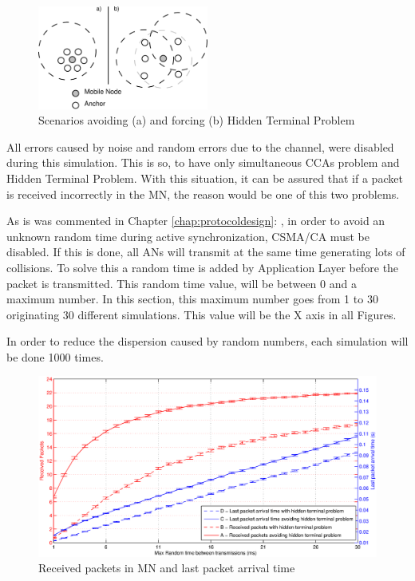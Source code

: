 \begin{figure}[ht]
 \begin{center}
  \includegraphics[width=0.5\textwidth]{hiddenvsnohidden.eps}
 \end{center}
 \caption{Scenarios avoiding (a) and forcing (b) Hidden Terminal Problem}
 \label{fig:hiddenvsnohidden}
\end{figure}

All errors caused by noise and random errors due to the channel, were disabled during this simulation. This is so, to have only simultaneous \acp{CCA} 
problem and Hidden Terminal Problem. With this situation, it can be assured that if a packet is received incorrectly in the \ac{MN}, the reason would 
be one of this two problems.

As is was commented in Chapter \ref{chap:protocoldesign}: , in order to avoid an unknown random time during active 
synchronization, \ac{CSMA/CA} must be disabled. If this is done, all \acp{AN} will transmit at the same time generating lots of collisions. To solve this
a random time is added by Application Layer before the packet is transmitted. This random time value, will be between 0 and a maximum number. In this
section, this maximum number goes from 1 to 30 originating 30 different simulations. This value will be the X axis in all Figures. 

In order to reduce the dispersion caused by random numbers, each simulation will be done 1000 times.

\begin{figure}[ht]
 \begin{center}
  \includegraphics[width=1\textwidth]{receivedPacketsAndLastPacketArrival.eps}
 \end{center}
 \caption{Received packets in \ac{MN} and last packet arrival time}
 \label{fig:receivedPacketsAndLastPacketArrival}
\end{figure}


